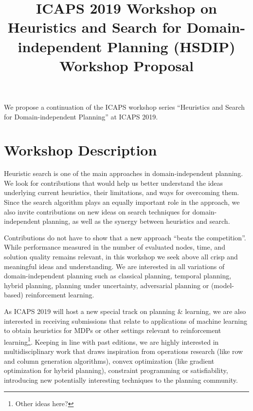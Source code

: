 \documentclass[10pt]{article}
\begin{document}
\title{ICAPS 2019 Workshop on \\ Heuristics and Search for Domain-independent
Planning (HSDIP)\\ \vspace*{0.7cm} Workshop Proposal
}
\date{}

\author{}

\maketitle


We propose a continuation of the ICAPS workshop series ``Heuristics
and Search for Domain-independent Planning'' at ICAPS 2019.

\section*{Workshop Description}
Heuristic search is one of the main approaches in domain-independent
planning.  We look for contributions that would help us better
understand the ideas underlying current heuristics, their limitations,
and ways for overcoming them.
%
Since the search algorithm plays an equally important role in the
approach, we also invite contributions on new ideas on search
techniques for domain-independent planning, as well as the synergy
between heuristics and search.

Contributions do not have to show that a new approach ``beats the competition''.
While performance measured in the number of evaluated nodes, time, and solution
quality remains relevant, in this workshop we seek above all crisp and
meaningful ideas and understanding.
%
We are interested in all variations of domain-independent planning
such as classical planning, temporal planning, hybrid planning, planning under
uncertainty, adversarial planning or (model-based) reinforcement learning.

As ICAPS 2019 will host a new special track on planning \& learning, we are also interested
in receiving submissions that relate to applications of machine learning to
obtain heuristics for MDPs or other settings relevant to reinforcement learning\footnote{Other
ideas here?}. Keeping in line with past editions, we are highly interested in multidisciplinary work that
draws inspiration from operations research (like row and column generation algorithms),
convex optimization (like gradient optimization for hybrid planning),
constraint programming or satisfiability, introducing
new potentially interesting techniques to the planning community.
\end{document}
